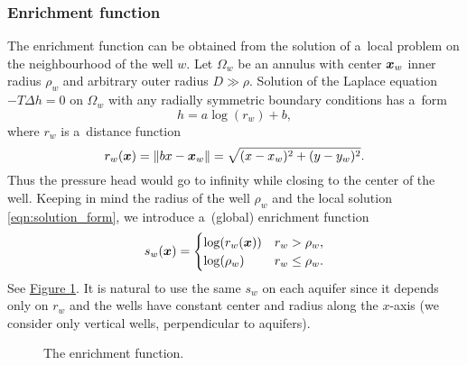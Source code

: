 \documentclass[dvipsnames,FM,Dis]{tulthesis}
\newcommand{\fig}[1]{\hyperref[#1]{Figure \ref{#1}}}
\newcommand{\figpath}{figures/}
\newcommand{\notePE}[1]{{\color{Orange} \textbf{PE: } \textit{#1}}}
\begin{document}
\subsubsection{Enrichment function}
The enrichment function can be obtained from the solution of a~local problem on the neighbourhood of the well $w$.
Let $\Omega_w$ be an annulus with center $\mathbf{\boldsymbol{x}}_w$ inner radius $\rho_w$ and arbitrary outer radius $D \gg \rho$.
Solution of the Laplace equation $-T \Delta h = 0$ on $\Omega_w$ with any radially symmetric boundary conditions has a~form
%
\begin{equation} \label{eqn:solution_form}
  h = a \log(r_w)+b, %
\end{equation}
where $r_w$ is a~distance function
\begin{equation} \label{eqn:distance}
r_w(\mathbf{\boldsymbol{x}}) = \|\\bx - \mathbf{\boldsymbol{x}}_w\|= \sqrt{(x-x_w)^2+(y-y_w)^2}.
\end{equation}
%
Thus the pressure head would go to infinity while closing to the center of the well.
Keeping in mind the radius of the well $\rho_w$ and the local solution \eqref{eqn:solution_form}, 
we introduce a~(global) enrichment function
%
\begin{equation}
\label{eqn:enrich_func}
s_w(\mathbf{\boldsymbol{x}}) = 
  \begin{cases}
  \log(r_w(\mathbf{\boldsymbol{x}})) & r_w > \rho_w,\\
  \log(\rho_w) & r_w \le \rho_w.\\
  \end{cases}
\end{equation}
See \fig{fig:enrich_func}.
It is natural to use the same $s_w$ on each aquifer since it depends only on $r_w$ and the wells have constant center and radius along the $x$-axis
(we consider only vertical wells, perpendicular to aquifers).
%

\begin{figure}[!htb]
  \begin{center}         
    \def\svgwidth{0.5\textwidth}
    
  \end{center}
  \caption{The enrichment function.}
  \label{fig:enrich_func}
\end{figure}
\end{document}
